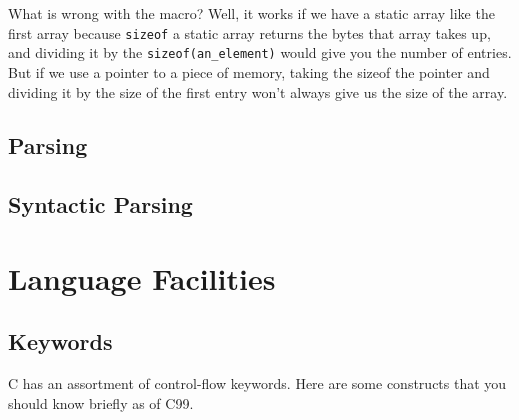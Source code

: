 What is wrong with the macro? Well, it works if we have a static array like the first array because \texttt{sizeof} a static array returns the bytes that array takes up, and dividing it by the \texttt{sizeof(an\_element)} would give you the number of entries. But if we use a pointer to a piece of memory, taking the sizeof the pointer and dividing it by the size of the first entry won't always give us the size of the array.

\subsection{Parsing}

\subsection{Syntactic Parsing}

\section{Language Facilities}

\subsection{Keywords}

C has an assortment of control-flow keywords. Here are some constructs that you should know briefly as of C99.

